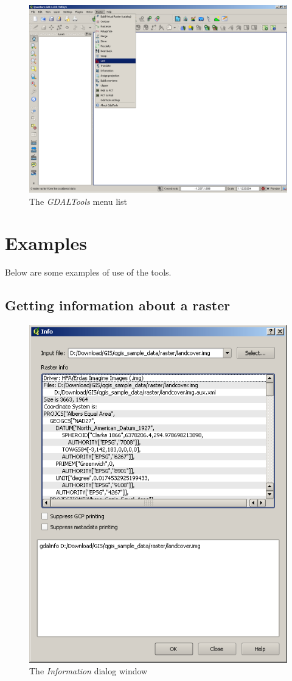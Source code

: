 {\begin{figure}[ht]
   \centering
   \caption{\label{gdaltools_menu}The \emph{GDALTools} menu list \nixcaption}
   \includegraphics[clip=true, width=12cm]{plugins_gdaltools_images/raster_menu}
\end{figure}

\section{Examples}\label{gdal_examples}
Below are some examples of use of the tools.
\subsection{Getting information about a raster}
\begin{figure}[ht]
   \centering
   \caption{\label{gdalinfo}The \emph{Information} dialog window \nixcaption}
   \includegraphics[clip=true, width=12cm]{plugins_gdaltools_images/gdalinfo}
\end{figure}

}
